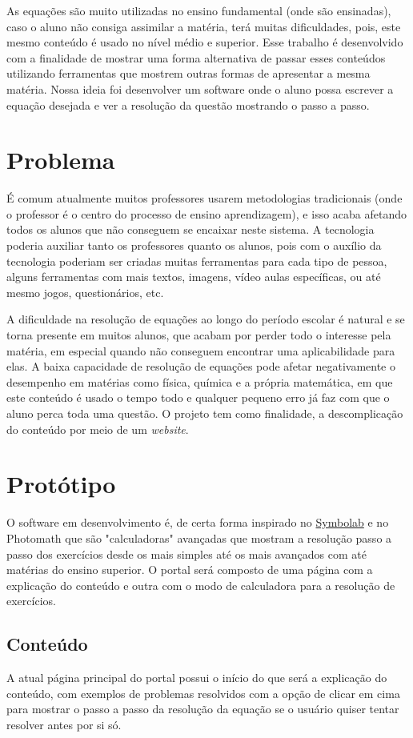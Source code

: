\documentclass[12pt]{report}
\begin{document}
As equações são muito utilizadas no ensino fundamental (onde são ensinadas), caso o aluno não consiga assimilar a matéria, terá muitas dificuldades, pois, este mesmo conteúdo é usado no  nível médio e superior. Esse trabalho é desenvolvido com a finalidade de mostrar uma forma alternativa de passar esses conteúdos utilizando ferramentas que mostrem outras formas de apresentar a mesma matéria. Nossa ideia foi desenvolver um software onde o aluno possa escrever a equação desejada e ver a resolução da questão mostrando o passo a passo. 

\chapter{Problema}
É  comum atualmente muitos professores usarem metodologias tradicionais (onde o professor é o centro do processo de ensino aprendizagem), e isso acaba afetando todos os alunos que não conseguem se encaixar neste sistema. A tecnologia poderia auxiliar tanto os professores quanto os alunos, pois com o auxílio da tecnologia poderiam ser criadas muitas ferramentas para cada tipo de pessoa, alguns ferramentas com mais textos, imagens, vídeo aulas específicas, ou até mesmo jogos, questionários, etc.

A dificuldade na resolução de equações ao longo do período escolar é natural e se torna presente em muitos alunos, que acabam por perder todo o interesse pela matéria, em especial quando não conseguem encontrar uma aplicabilidade para elas. A baixa capacidade de resolução de equações pode afetar negativamente o desempenho em matérias como física, química e a própria matemática, em que este conteúdo é usado o tempo todo e qualquer pequeno erro já faz com que o aluno perca toda uma questão. O projeto tem como finalidade, a descomplicação do conteúdo por meio de um \textit{website}.

\chapter{Protótipo}
O software em desenvolvimento é, de certa forma inspirado no \href{https://pt.symbolab.com/}{Symbolab} e no Photomath que são "calculadoras" avançadas que mostram a resolução passo a passo dos exercícios desde os mais simples até os mais avançados com até matérias do ensino superior. O portal será composto de uma página com a explicação do conteúdo e outra com o modo de calculadora para a resolução de exercícios.

\section{Conteúdo}
A atual página principal do portal possui o início do que será a explicação do conteúdo, com exemplos de problemas resolvidos com a opção de clicar em cima para mostrar o passo a passo da resolução da equação se o usuário quiser tentar resolver antes por si só.
\end{document}
